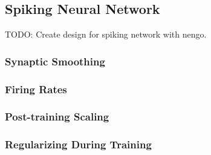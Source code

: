 \subsection{Spiking Neural Network}

\color{red} TODO: Create design for spiking network with nengo. \color{black}

\subsubsection{Synaptic Smoothing}

\subsubsection{Firing Rates}

\subsubsection{Post-training Scaling}

\subsubsection{Regularizing During Training}